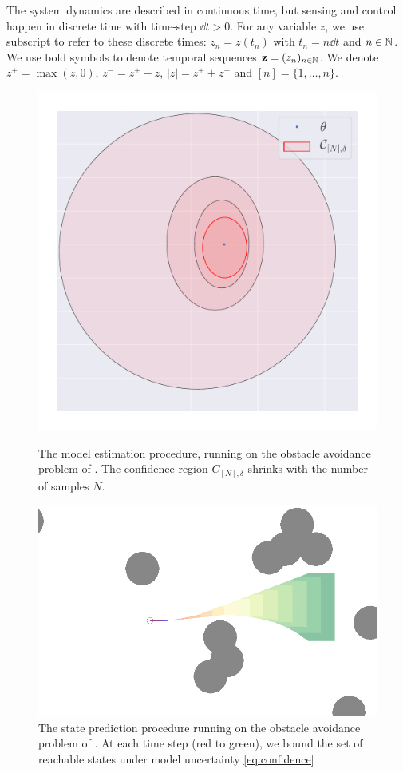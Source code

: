 \documentclass{article}
\begin{document}
The system dynamics are described in continuous time, but sensing and control happen in discrete time with time-step $\dd t>0$. For any variable $z$, we use subscript to refer to these discrete times: $z_n = z(t_n)$ with $t_n = n\dd t$ and $n\in\mathbb{N}$. We use bold symbols to denote temporal sequences $\mathbf{z} = (z_n)_{n\in\mathbb{N}}$. We denote $z^+ = \max(z,0)$, $z^- = z^+-z$, $|z| = z^++z^-$ and $[n]=\{1,\dots, n\}$.

\begin{figure}
	\begin{minipage}[b]{0.49\linewidth}
		\centering
		\includegraphics[trim={1cm 0 0 0}, clip, width=0.6\linewidth]{img/ellipsoid}
		\caption{The model estimation procedure, running on the obstacle avoidance problem of . The confidence region $C_{[N],\delta}$ shrinks with the number of samples $N$.}
		\label{fig:estimation}
	\end{minipage}
	\hfill
	\begin{minipage}[b]{0.49\linewidth}
		\centering
		\includegraphics[trim={4cm 0 0 0}, clip, width=0.8\linewidth]{img/obstacle_small}
		\caption{The state prediction procedure running on the obstacle avoidance problem of . At each time step (red to green), we bound the set of reachable states under model uncertainty \eqref{eq:confidence}}
		\label{fig:prediction}
	\end{minipage}%
\end{figure}
\end{document}
